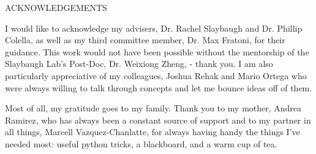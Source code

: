 \begin{center}
    ACKNOWLEDGEMENTS
\end{center}

I would like to acknowledge my advisers, Dr. Rachel Slaybaugh and Dr. Phillip Colella, as well as my third committee member, Dr. Max Fratoni, for their guidance. This work would not have been possible without the mentorship of the Slaybaugh Lab's Post-Doc, Dr. Weixiong Zheng, - thank you. I am also particularly appreciative of my colleagues, Joshua Rehak and Mario Ortega who were always willing to talk through concepts and let me bounce ideas off of them. 

Most of all, my gratitude goes to my family. Thank you to my mother, Andrea Ramirez, who has always been a constant source of support and to my partner in all things, Marcell Vazquez-Chanlatte,  for always having handy the things I've needed most: useful python tricks, a blackboard, and a warm cup of tea.  